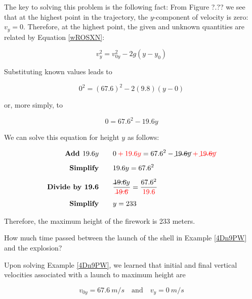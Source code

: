 \documentclass[dvipsnames]{article}
\numberwithin{equation}{section}
\numberwithin{figure}{section}
\begin{document}
The key to solving this problem is the following fact: From Figure ?.?? we see that at the highest point in the trajectory, the $y$-component of velocity is zero: $v_y = 0$. Therefore, at the highest point, the given and unknown quantities are related by Equation \eqref{wROSXN}:

\begin{equation*}
    v_y^2 = v_{0y}^2 - 2 g \left(y-y_0\right)
\end{equation*}

Substituting known values leads to

\begin{equation*}
    0^2 = \left(67.6\right)^2 - 2 (9.8) \left(y - 0\right)
\end{equation*}

or, more simply, to

\begin{equation*}
    0 = 67.6^2 - 19.6 y
\end{equation*}

We can solve this equation for height $y$ as follows:

\begin{align*}
    \textbf{Add $19.6 y$} \qquad & 0 \mathbin{\color{red} +} \textcolor{red}{19.6 y} = 67.6^2 - \cancel{19.6 y} \mathbin{\color{red} +} \textcolor{red}{\cancel{19.6 y}}\\[1ex]
    \textbf{Simplify} \qquad & 19.6 y = 67.6^2\\[1ex]
    \textbf{Divide by 19.6} \qquad & \frac{\cancel{19.6} y}{\textcolor{red}{\cancel{19.6}}} = \frac{67.6^2}{\textcolor{red}{19.6}}\\[1ex]
    \textbf{Simplify} \qquad & y = 233
\end{align*}

Therefore, the maximum height of the firework is 233 meters.

\solutionEnd

\begin{example} \label{t57osh}
    How much time passed between the launch of the shell in Example \ref{4Dn9PW} and the explosion?
\end{example}

\Solution
Upon solving Example \ref{4Dn9PW}, we learned that initial and final vertical velocities associated with a launch to maximum height are

\begin{equation*}
    v_{0y} = \SI{67.6}{m/s} \quad \text{and} \quad v_y = \SI{0}{m/s}
\end{equation*}
\end{document}
